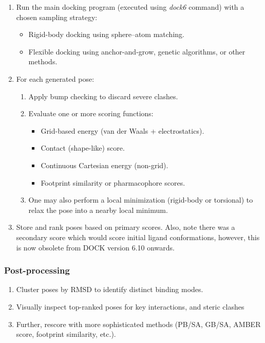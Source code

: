 \documentclass[12pt, a4paper]{article}
\begin{document}
\begin{enumerate}
  \item Run the main docking program (executed using \textit{dock6} command) with a chosen sampling strategy:
        \begin{itemize}
          \item Rigid-body docking using sphere–atom matching.
          \item Flexible docking using anchor-and-grow, genetic algorithms, or other methods.
        \end{itemize}

  \item For each generated pose:
        \begin{enumerate}
          \item Apply bump checking to discard severe clashes.
          \item Evaluate one or more scoring functions:
                \begin{itemize}
                  \item Grid-based energy (van der Waals + electrostatics).
                  \item Contact (shape-like) score.
                  \item Continuous Cartesian energy (non-grid).
                  \item Footprint similarity or pharmacophore scores.
                \end{itemize}

          \item One may also perform a local minimization (rigid-body or torsional) to relax the pose into a nearby local minimum.
        \end{enumerate}
  \item Store and rank poses based on primary scores. Also, note there was a secondary score which would score initial ligand conformations, however, this is now obsolete from DOCK version 6.10 onwards.
\end{enumerate}

\subsubsection{Post-processing}

\begin{enumerate}
  \item Cluster poses by RMSD to identify distinct binding modes.
  \item Visually inspect top-ranked poses for key interactions, and steric clashes
  \item Further, rescore with more sophisticated methods (PB/SA, GB/SA, AMBER score, footprint similarity, etc.).
\end{enumerate}
\end{document}
